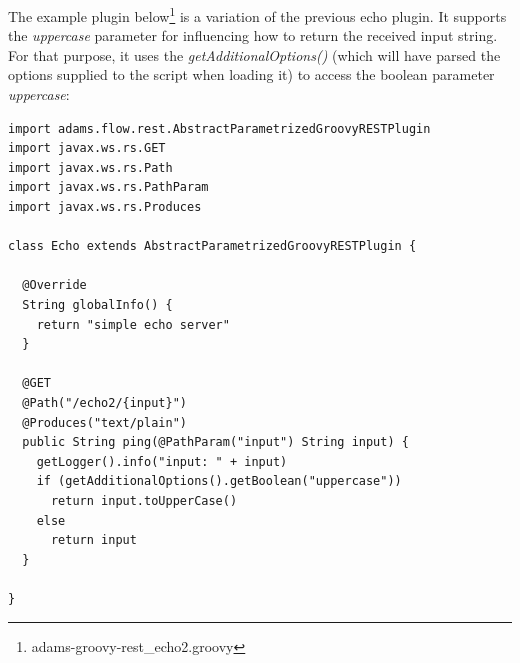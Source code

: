 \documentclass[a4paper]{book}
\begin{document}
The example plugin below\footnote{adams-groovy-rest\_echo2.groovy} is a
variation of the previous echo plugin. It supports the \textit{uppercase} parameter
for influencing how to return the received input string. For that purpose,
it uses the \textit{getAdditionalOptions()} (which will have parsed the options
supplied to the script when loading it) to access the boolean parameter
\textit{uppercase}:
\begin{verbatim}
import adams.flow.rest.AbstractParametrizedGroovyRESTPlugin
import javax.ws.rs.GET
import javax.ws.rs.Path
import javax.ws.rs.PathParam
import javax.ws.rs.Produces

class Echo extends AbstractParametrizedGroovyRESTPlugin {

  @Override
  String globalInfo() {
    return "simple echo server"
  }

  @GET
  @Path("/echo2/{input}")
  @Produces("text/plain")
  public String ping(@PathParam("input") String input) {
    getLogger().info("input: " + input)
    if (getAdditionalOptions().getBoolean("uppercase"))
      return input.toUpperCase()
    else
      return input
  }

}
\end{verbatim}



\end{document}

